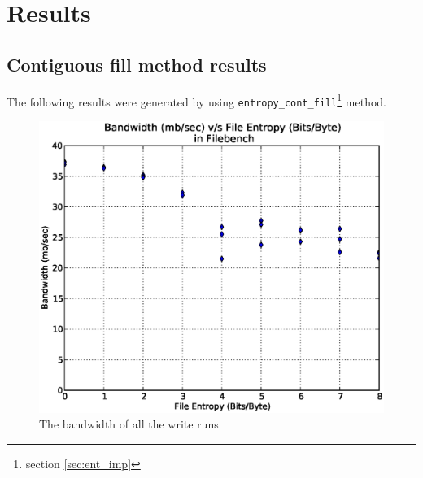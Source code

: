\chapter{Results}\label{chap:res}

\section{Contiguous fill method results}

The following results were generated by using \verb+entropy_cont_fill+\footnote{section \ref{sec:ent_imp}} method.

\begin{figure}[H]
\begin{center}
\includegraphics[scale=.55]{../results/set1/write_bw_all.eps}
\caption{The bandwidth of all the write runs}
\label{fig:wb}
\end{center}
\end{figure}

